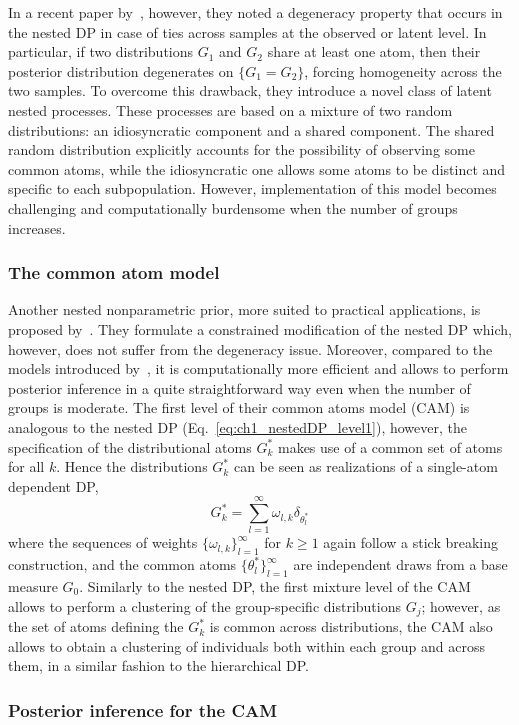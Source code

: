 In a recent paper by~\citet{camerlenghi2019}, however, they noted a degeneracy property that occurs in the nested DP in case of  ties across samples at the observed or latent level.
In particular, if two distributions $G_1$ and $G_2$ share at least one atom, then their posterior distribution degenerates on
$\{G_1=G_2\}$, forcing homogeneity across the two samples. 
To overcome this drawback, they introduce a novel class of latent nested processes.
These processes are based on a mixture of two random distributions: an idiosyncratic component and a shared component. 
The shared random distribution explicitly accounts for the possibility of observing some common atoms, while the idiosyncratic one
allows some atoms to be distinct and specific to each subpopulation.
However, implementation of this model becomes challenging and computationally burdensome when the number of groups increases.

\subsubsection*{The common atom model}
Another nested nonparametric prior, more suited to practical applications, is proposed by~\citet{denti2021}. They formulate a constrained modification of the nested DP which, however, does not suffer from the degeneracy issue. Moreover, compared to the models introduced by~\citet{camerlenghi2019}, it is computationally more efficient and allows to perform posterior inference in a quite straightforward way even when the number of groups is moderate.
%
The first level of their common atoms model (CAM) is analogous to the nested DP (Eq.~\ref{eq:ch1_nestedDP_level1}), however, the specification of the distributional atoms $G^*_k$ makes use of a common set of atoms for all $k$. Hence the distributions $G^*_k$ can be seen as realizations of a single-atom dependent DP,
\begin{equation*}
G^*_k = \sum_{l=1}^{\infty} \omega_{l,k} \delta_{\theta^*_{l}} 
\end{equation*}
where the sequences of weights $\{\omega_{l,k}\}_{l=1}^{\infty}$ for $k\geq1$ again follow a stick breaking construction, and the common atoms $\{\theta^*_l\}_{l=1}^{\infty}$ are independent draws from a base measure $G_0$.
Similarly to the nested DP, the first mixture level of the CAM allows to perform a clustering of the group-specific distributions $G_j$; however, as the set of atoms defining the $G^*_k$ is common across distributions, the CAM also allows to obtain a clustering of individuals both within each group and across them, in a similar fashion to the hierarchical DP.

\subsubsection*{Posterior inference for the CAM}



















